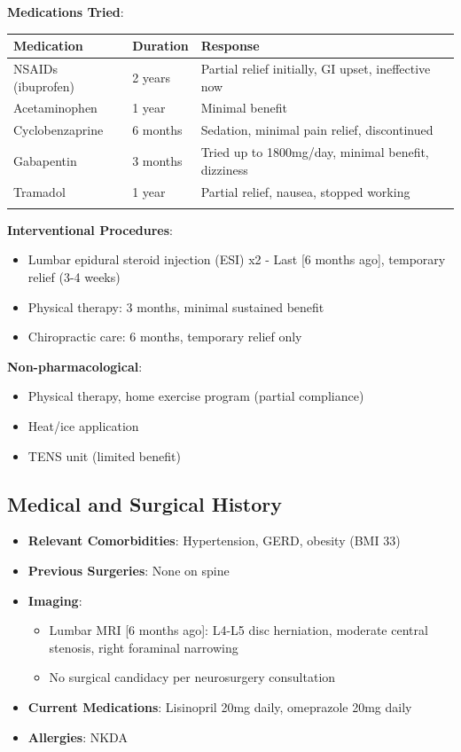 \documentclass[11pt,letterpaper]{article}
\begin{document}
\textbf{Medications Tried}:
\begin{longtable}{|p{3cm}|p{2.5cm}|p{7.5cm}|}
\hline
\textbf{Medication} & \textbf{Duration} & \textbf{Response} \\ \hline
NSAIDs (ibuprofen) & 2 years & Partial relief initially, GI upset, ineffective now \\ \hline
Acetaminophen & 1 year & Minimal benefit \\ \hline
Cyclobenzaprine & 6 months & Sedation, minimal pain relief, discontinued \\ \hline
Gabapentin & 3 months & Tried up to 1800mg/day, minimal benefit, dizziness \\ \hline
Tramadol & 1 year & Partial relief, nausea, stopped working \\ \hline
[List others] & & \\ \hline
\end{longtable}

\textbf{Interventional Procedures}:
\begin{itemize}[leftmargin=*]
    \item Lumbar epidural steroid injection (ESI) x2 - Last [6 months ago], temporary relief (3-4 weeks)
    \item Physical therapy: 3 months, minimal sustained benefit
    \item Chiropractic care: 6 months, temporary relief only
\end{itemize}

\textbf{Non-pharmacological}:
\begin{itemize}[leftmargin=*]
    \item Physical therapy, home exercise program (partial compliance)
    \item Heat/ice application
    \item TENS unit (limited benefit)
\end{itemize}

\subsection*{Medical and Surgical History}

\begin{itemize}[leftmargin=*]
    \item \textbf{Relevant Comorbidities}: Hypertension, GERD, obesity (BMI 33)
    \item \textbf{Previous Surgeries}: None on spine
    \item \textbf{Imaging}:
    \begin{itemize}
        \item Lumbar MRI [6 months ago]: L4-L5 disc herniation, moderate central stenosis, right foraminal narrowing
        \item No surgical candidacy per neurosurgery consultation
    \end{itemize}
    \item \textbf{Current Medications}: Lisinopril 20mg daily, omeprazole 20mg daily
    \item \textbf{Allergies}: NKDA
\end{itemize}
\end{document}
